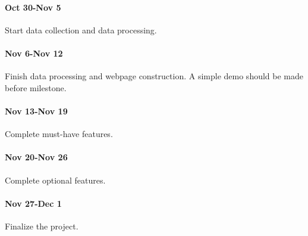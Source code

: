 \documentclass[12pt, fullpage,letterpaper]{article}
\begin{document}
\paragraph{Oct 30-Nov 5} Start data collection and data processing.
\paragraph{Nov 6-Nov 12} Finish data processing and webpage construction. A simple demo should be made before milestone.
\paragraph{Nov 13-Nov 19} Complete must-have features.
\paragraph{Nov 20-Nov 26} Complete optional features.
\paragraph{Nov 27-Dec 1} Finalize the project.
\end{document}
